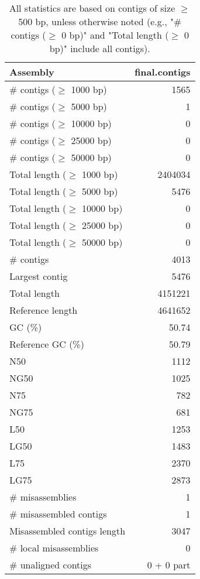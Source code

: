 \documentclass[12pt,a4paper]{article}
\begin{document}
\begin{table}[ht]
\begin{center}
\caption{All statistics are based on contigs of size $\geq$ 500 bp, unless otherwise noted (e.g., "\# contigs ($\geq$ 0 bp)" and "Total length ($\geq$ 0 bp)" include all contigs).}
\begin{tabular}{|l*{1}{|r}|}
\hline
Assembly & final.contigs \\ \hline
\# contigs ($\geq$ 1000 bp) & 1565 \\ \hline
\# contigs ($\geq$ 5000 bp) & 1 \\ \hline
\# contigs ($\geq$ 10000 bp) & 0 \\ \hline
\# contigs ($\geq$ 25000 bp) & 0 \\ \hline
\# contigs ($\geq$ 50000 bp) & 0 \\ \hline
Total length ($\geq$ 1000 bp) & 2404034 \\ \hline
Total length ($\geq$ 5000 bp) & 5476 \\ \hline
Total length ($\geq$ 10000 bp) & 0 \\ \hline
Total length ($\geq$ 25000 bp) & 0 \\ \hline
Total length ($\geq$ 50000 bp) & 0 \\ \hline
\# contigs & 4013 \\ \hline
Largest contig & 5476 \\ \hline
Total length & 4151221 \\ \hline
Reference length & 4641652 \\ \hline
GC (\%) & 50.74 \\ \hline
Reference GC (\%) & 50.79 \\ \hline
N50 & 1112 \\ \hline
NG50 & 1025 \\ \hline
N75 & 782 \\ \hline
NG75 & 681 \\ \hline
L50 & 1253 \\ \hline
LG50 & 1483 \\ \hline
L75 & 2370 \\ \hline
LG75 & 2873 \\ \hline
\# misassemblies & 1 \\ \hline
\# misassembled contigs & 1 \\ \hline
Misassembled contigs length & 3047 \\ \hline
\# local misassemblies & 0 \\ \hline
\# unaligned contigs & 0 + 0 part \\ \hline

\end{tabular}
\end{center}
\end{table}
\end{document}
